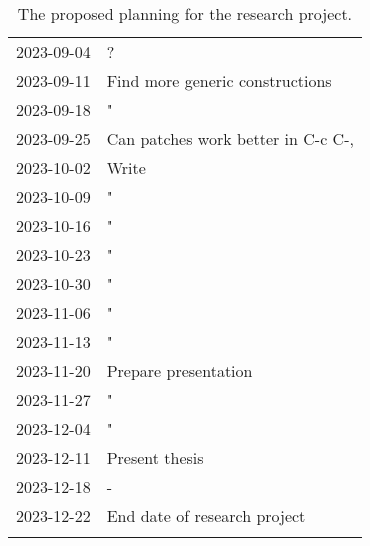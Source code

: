 \documentclass{article}
\theoremstyle{plain}%
\theoremstyle{definition}
\begin{document}
\begin{longtable}{l l}
2023-09-04 & ?                                                                  \\
2023-09-11 & Find more generic constructions                                    \\
2023-09-18 & "                                                                  \\
2023-09-25 & Can patches work better in C-c C-,                                 \\
2023-10-02 & Write                                                              \\
2023-10-09 & "                                                                  \\
2023-10-16 & "                                                                  \\
2023-10-23 & "                                                                  \\
2023-10-30 & "                                                                  \\
2023-11-06 & "                                                                  \\
2023-11-13 & "                                                                  \\
2023-11-20 & Prepare presentation                                               \\
2023-11-27 & "                                                                  \\
2023-12-04 & "                                                                  \\
2023-12-11 & Present thesis                                                     \\
2023-12-18 & -                                                                  \\
2023-12-22 & End date of research project                                       \\
\caption{The proposed planning for the research project.}
\end{longtable}
\end{document}
